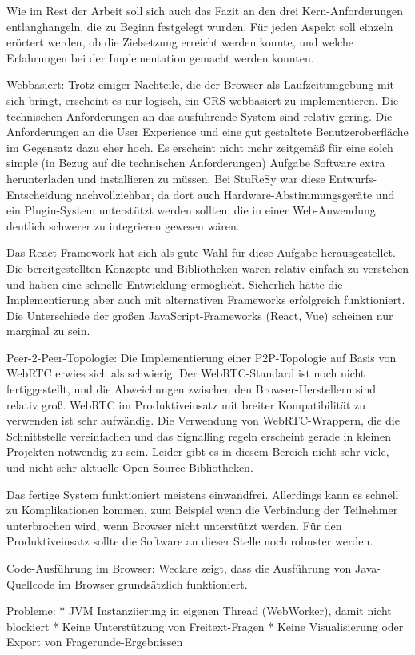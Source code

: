 Wie im Rest der Arbeit soll sich auch das Fazit an den drei Kern-Anforderungen entlanghangeln, die zu Beginn festgelegt wurden. Für jeden Aspekt soll einzeln erörtert werden, ob die Zielsetzung erreicht werden konnte, und welche Erfahrungen bei der Implementation gemacht werden konnten.

Webbasiert:
Trotz einiger Nachteile, die der Browser als Laufzeitumgebung mit sich bringt, erscheint es nur logisch, ein CRS webbasiert zu implementieren. Die technischen Anforderungen an das ausführende System sind relativ gering. Die Anforderungen an die User Experience und eine gut gestaltete Benutzeroberfläche im Gegensatz dazu eher hoch. Es erscheint nicht mehr zeitgemäß für eine solch simple (in Bezug auf die technischen Anforderungen) Aufgabe Software extra herunterladen und installieren zu müssen. Bei StuReSy war diese Entwurfs-Entscheidung nachvollziehbar, da dort auch Hardware-Abstimmungsgeräte und ein Plugin-System unterstützt werden sollten, die in einer Web-Anwendung deutlich schwerer zu integrieren gewesen wären.

Das React-Framework hat sich als gute Wahl für diese Aufgabe herausgestellet. Die bereitgestellten Konzepte und Bibliotheken waren relativ einfach zu verstehen und haben eine schnelle Entwicklung ermöglicht. Sicherlich hätte die Implementierung aber auch mit alternativen Frameworks erfolgreich funktioniert. Die Unterschiede der großen JavaScript-Frameworks (React, Vue) scheinen nur marginal zu sein.

Peer-2-Peer-Topologie: Die Implementierung einer P2P-Topologie auf Basis von WebRTC erwies sich als schwierig. Der WebRTC-Standard ist noch nicht fertiggestellt, und die Abweichungen zwischen den Browser-Herstellern sind relativ groß. WebRTC im Produktiveinsatz mit breiter Kompatibilität zu verwenden ist sehr aufwändig. Die Verwendung von WebRTC-Wrappern, die die Schnittstelle vereinfachen und das Signalling regeln erscheint gerade in kleinen Projekten notwendig zu sein. Leider gibt es in diesem Bereich nicht sehr viele, und nicht sehr aktuelle Open-Source-Bibliotheken.

Das fertige System funktioniert meistens einwandfrei. Allerdings kann es schnell zu Komplikationen kommen, zum Beispiel wenn die Verbindung der Teilnehmer unterbrochen wird, wenn Browser nicht unterstützt werden. Für den Produktiveinsatz sollte die Software an dieser Stelle noch robuster werden.

Code-Ausführung im Browser: Weclare zeigt, dass die Ausführung von Java-Quellcode im Browser grundsätzlich funktioniert.

Probleme:
* JVM Instanziierung in eigenen Thread (WebWorker), damit nicht blockiert
* Keine Unterstützung von Freitext-Fragen
* Keine Visualisierung oder Export von Fragerunde-Ergebnissen




